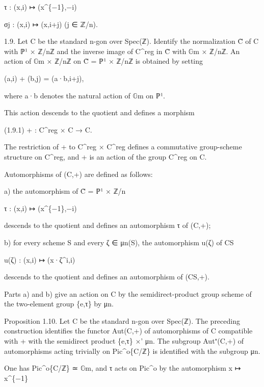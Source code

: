 \documentclass[11pt,a4paper]{article}
\begin{document}
τ : (x,i) ↦ (x\textasciicircum{}\{−1\},−i)

σ\textunderscore{}j : (x,i) ↦ (x,i+j)        (j ∈ ℤ/n).

1.9.     Let C be the standard n-gon over Spec(ℤ). Identify the normalization C̃ of C with ℙ¹ × ℤ/nℤ and the inverse image of C\textasciicircum{}reg in C̃ with \ensuremath{\mathbb{G}}\textunderscore{}m × ℤ/nℤ. An action of \ensuremath{\mathbb{G}}\textunderscore{}m × ℤ/nℤ on C̃ = ℙ¹ × ℤ/nℤ is obtained by setting

(a,i) + (b,j) = (a·b,i+j),

where a·b denotes the natural action of \ensuremath{\mathbb{G}}\textunderscore{}m on ℙ¹.

This action descends to the quotient and defines a morphism

(1.9.1)        + : C\textasciicircum{}reg × C → C.

The restriction of + to C\textasciicircum{}reg × C\textasciicircum{}reg defines a commutative group-scheme structure on C\textasciicircum{}reg, and + is an action of the group C\textasciicircum{}reg on C.

Automorphisms of (C,+) are defined as follows:

a) the automorphism of C̃ = ℙ¹ × ℤ/n

τ : (x,i) ↦ (x\textasciicircum{}\{−1\},−i)

descends to the quotient and defines an automorphism τ of (C,+);

b) for every scheme S and every ζ ∈ μ\textunderscore{}n(S), the automorphism u(ζ) of C\textunderscore{}S

u(ζ) : (x,i) ↦ (x·ζ\textasciicircum{}i,i)

descends to the quotient and defines an automorphism of (C\textunderscore{}S,+).

Parts a) and b) give an action on C by the semidirect-product group scheme of the two-element group \{e,τ\} by μ\textunderscore{}n.

Proposition 1.10.     Let C be the standard n-gon over Spec(ℤ). The preceding construction identifies the functor Aut(C,+) of automorphisms of C compatible with + with the semidirect product \{e,τ\} ×' μ\textunderscore{}n. The subgroup Aut⁺(C,+) of automorphisms acting trivially on Pic\textasciicircum{}o\textunderscore{}\{C/ℤ\} is identified with the subgroup μ\textunderscore{}n.

One has Pic\textasciicircum{}o\textunderscore{}\{C/ℤ\} ≃ \ensuremath{\mathbb{G}}\textunderscore{}m, and τ acts on Pic\textasciicircum{}o by the automorphism x ↦ x\textasciicircum{}\{−1\}
\end{document}
